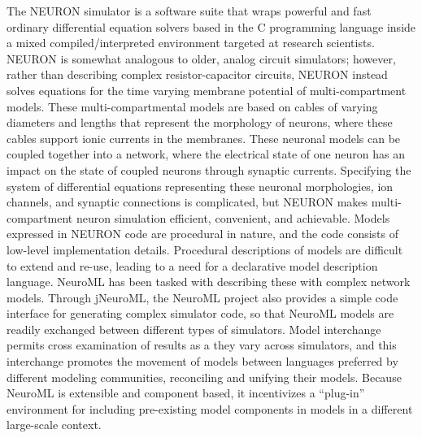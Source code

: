 \newline
{}
The NEURON simulator is a software suite that wraps powerful and fast ordinary differential equation solvers based in the C programming language inside a mixed compiled/interpreted environment targeted at research scientists. NEURON is somewhat analogous to older, analog circuit simulators; however, rather than describing complex resistor-capacitor circuits, NEURON instead solves equations for the time varying membrane potential of multi-compartment models.\newline
\newline
These multi-compartmental models are based on cables of varying diameters and lengths that represent the morphology of neurons, where these cables support ionic currents in the membranes. These neuronal models can be coupled together into a network, where the electrical state of one neuron has an impact on the state of coupled neurons through synaptic currents. Specifying the system of differential equations representing these neuronal morphologies, ion channels, and synaptic connections is complicated, but NEURON makes multi-compartment neuron simulation efficient, convenient, and achievable. Models expressed in NEURON code are procedural in nature, and the code consists of low-level implementation details. Procedural descriptions of models are difficult to extend and re-use, leading to a need for a declarative model description language. NeuroML has been tasked with describing these with complex network models.\newline
\newline
Through jNeuroML, the NeuroML project also provides a simple code interface for generating complex simulator code, so that NeuroML models are readily exchanged between different types of simulators. Model interchange permits cross examination of results as a they vary across simulators, and this interchange promotes the movement of models between languages preferred by different modeling communities, reconciling and unifying their models. Because NeuroML is extensible and component based, it incentivizes a “plug-in” environment for including pre-existing model components in models in a different large-scale context. 

